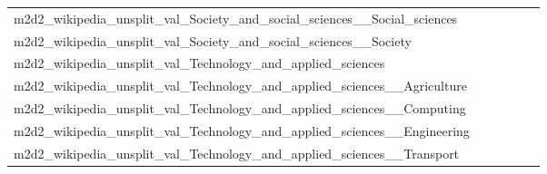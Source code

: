 \documentclass[dvipsnames]{article}
\begin{document}
\begin{appendix}
{\begin{longtable}{m{6cm}m{1.7cm}m{1.7cm}m{1.7cm}m{1.7cm}m{1.7cm}}
	m2d2\_wikipedia\_unsplit\_val\_Society\_and\_social\_sciences\_\_Social\_sciences  & \colorbox[HTML]{fdfede}{\makebox[\mywidth][c]{10.47}} & \colorbox[HTML]{d9f0a3}{\makebox[\mywidth][c]{10.16}} & \colorbox[HTML]{ffffe5}{\makebox[\mywidth][c]{10.95}} & \colorbox[HTML]{d0ec9e}{\makebox[\mywidth][c]{10.14}} & \colorbox[HTML]{77c578}{\makebox[\mywidth][c]{10.04}}\\
	m2d2\_wikipedia\_unsplit\_val\_Society\_and\_social\_sciences\_\_Society  & \colorbox[HTML]{fefee0}{\makebox[\mywidth][c]{12.48}} & \colorbox[HTML]{e9f6af}{\makebox[\mywidth][c]{12.13}} & \colorbox[HTML]{ffffe5}{\makebox[\mywidth][c]{13.02}} & \colorbox[HTML]{daf0a4}{\makebox[\mywidth][c]{12.07}} & \colorbox[HTML]{77c578}{\makebox[\mywidth][c]{11.93}}\\
	m2d2\_wikipedia\_unsplit\_val\_Technology\_and\_applied\_sciences  & \colorbox[HTML]{ffffe5}{\makebox[\mywidth][c]{8.51}} & \colorbox[HTML]{fcfdd5}{\makebox[\mywidth][c]{8.18}} & \colorbox[HTML]{ffffe5}{\makebox[\mywidth][c]{8.66}} & \colorbox[HTML]{b2df90}{\makebox[\mywidth][c]{7.93}} & \colorbox[HTML]{77c578}{\makebox[\mywidth][c]{7.88}}\\
	m2d2\_wikipedia\_unsplit\_val\_Technology\_and\_applied\_sciences\_\_Agriculture  & \colorbox[HTML]{fefee0}{\makebox[\mywidth][c]{12.45}} & \colorbox[HTML]{e5f4ab}{\makebox[\mywidth][c]{12.07}} & \colorbox[HTML]{ffffe5}{\makebox[\mywidth][c]{13.00}} & \colorbox[HTML]{daf0a4}{\makebox[\mywidth][c]{12.03}} & \colorbox[HTML]{77c578}{\makebox[\mywidth][c]{11.88}}\\
	m2d2\_wikipedia\_unsplit\_val\_Technology\_and\_applied\_sciences\_\_Computing  & \colorbox[HTML]{fcfed8}{\makebox[\mywidth][c]{13.62}} & \colorbox[HTML]{e5f4ab}{\makebox[\mywidth][c]{13.23}} & \colorbox[HTML]{ffffe5}{\makebox[\mywidth][c]{14.56}} & \colorbox[HTML]{daf0a4}{\makebox[\mywidth][c]{13.18}} & \colorbox[HTML]{77c578}{\makebox[\mywidth][c]{12.97}}\\
	m2d2\_wikipedia\_unsplit\_val\_Technology\_and\_applied\_sciences\_\_Engineering  & \colorbox[HTML]{fcfed7}{\makebox[\mywidth][c]{13.00}} & \colorbox[HTML]{eef8b2}{\makebox[\mywidth][c]{12.72}} & \colorbox[HTML]{ffffe5}{\makebox[\mywidth][c]{13.87}} & \colorbox[HTML]{dff2a7}{\makebox[\mywidth][c]{12.64}} & \colorbox[HTML]{77c578}{\makebox[\mywidth][c]{12.43}}\\
	m2d2\_wikipedia\_unsplit\_val\_Technology\_and\_applied\_sciences\_\_Transport  & \colorbox[HTML]{fcfed9}{\makebox[\mywidth][c]{14.34}} & \colorbox[HTML]{d3eda0}{\makebox[\mywidth][c]{13.90}} & \colorbox[HTML]{ffffe5}{\makebox[\mywidth][c]{15.20}} & \colorbox[HTML]{ddf1a6}{\makebox[\mywidth][c]{13.94}} & \colorbox[HTML]{77c578}{\makebox[\mywidth][c]{13.73}}\\

\end{longtable}}
\end{appendix}
\end{document}
